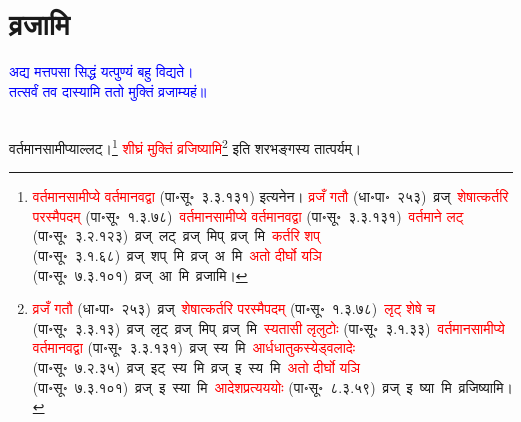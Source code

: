 \section[व्रजामि]{व्रजामि}
\centering\textcolor{blue}{अद्य मत्तपसा सिद्धं यत्पुण्यं बहु विद्यते।\nopagebreak\\
तत्सर्वं तव दास्यामि ततो मुक्तिं व्रजाम्यहं॥}\nopagebreak\\
\\
\fontsize{14}{21}\selectfont\begin{sloppypar}\justifying\noindent\hspace{10mm} वर्तमान\-सामीप्याल्लट्।\footnote{\textcolor{red}{वर्तमान\-सामीप्ये वर्तमानवद्वा} (पा॰सू॰~३.३.१३१) इत्यनेन। \textcolor{red}{व्रजँ गतौ} (धा॰पा॰~२५३)~\arrow व्रज्~\arrow \textcolor{red}{शेषात्कर्तरि परस्मैपदम्} (पा॰सू॰~१.३.७८)~\arrow \textcolor{red}{वर्तमान\-सामीप्ये वर्तमानवद्वा} (पा॰सू॰~३.३.१३१)~\arrow \textcolor{red}{वर्तमाने लट्} (पा॰सू॰~३.२.१२३)~\arrow व्रज्~लट्~\arrow व्रज्~मिप्~\arrow व्रज्~मि~\arrow \textcolor{red}{कर्तरि शप्‌} (पा॰सू॰~३.१.६८)~\arrow व्रज्~शप्~मि~\arrow व्रज्~अ~मि~\arrow \textcolor{red}{अतो दीर्घो यञि} (पा॰सू॰~७.३.१०१)~\arrow व्रज्~आ~मि~\arrow व्रजामि।} \textcolor{red}{शीघ्रं मुक्तिं व्रजिष्यामि}\footnote{\textcolor{red}{व्रजँ गतौ} (धा॰पा॰~२५३)~\arrow व्रज्~\arrow \textcolor{red}{शेषात्कर्तरि परस्मैपदम्} (पा॰सू॰~१.३.७८)~\arrow \textcolor{red}{लृट् शेषे च} (पा॰सू॰~३.३.१३)~\arrow व्रज्~लृट्~\arrow व्रज्~मिप्~\arrow व्रज्~मि~\arrow \textcolor{red}{स्यतासी लृलुटोः} (पा॰सू॰~३.१.३३)~\arrow \textcolor{red}{वर्तमान\-सामीप्ये वर्तमानवद्वा} (पा॰सू॰~३.३.१३१)~\arrow व्रज्~स्य~मि~\arrow \textcolor{red}{आर्धधातुकस्येड्वलादेः} (पा॰सू॰~७.२.३५)~\arrow व्रज्~इट्~स्य~मि~\arrow व्रज्~इ~स्य~मि~\arrow \textcolor{red}{अतो दीर्घो यञि} (पा॰सू॰~७.३.१०१)~\arrow व्रज्~इ~स्या~मि~\arrow \textcolor{red}{आदेश\-प्रत्यययोः} (पा॰सू॰~८.३.५९)~\arrow व्रज्~इ~ष्या~मि~\arrow व्रजिष्यामि।} इति शरभङ्गस्य तात्पर्यम्।\end{sloppypar}
